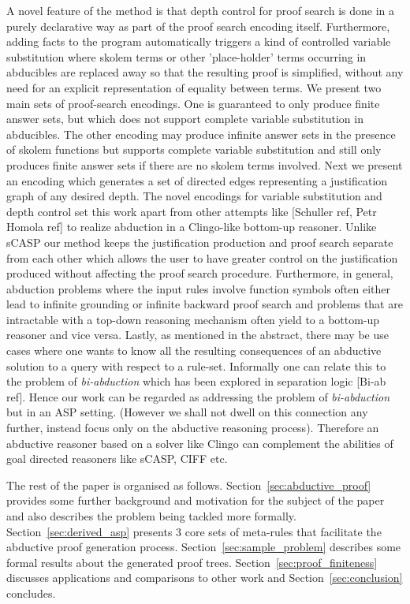 \documentclass[sigconf]{acmart}
\begin{document}
A novel feature of the method is that depth control for proof search is done in a purely declarative way as part of the proof search encoding itself. Furthermore, adding facts to the program automatically triggers a kind of controlled variable substitution where skolem terms or other 'place-holder' terms occurring in abducibles are replaced away so that the resulting proof is simplified, without any need for an explicit representation of equality between terms. We present two main sets of proof-search encodings. One is guaranteed to only produce finite answer sets, but which does not support complete variable substitution in abducibles. The other encoding may produce infinite answer sets in the presence of skolem functions but supports complete variable substitution and still only produces finite answer sets if there are no skolem terms involved. Next we present an encoding which generates a set of directed edges representing a justification graph of any desired depth. The novel encodings for variable substitution and depth control set this work apart from other attempts like [Schuller ref, Petr Homola ref] to realize abduction in a Clingo-like bottom-up reasoner. Unlike sCASP our method keeps the justification production and proof search separate from each other which allows the user to have greater control on the justification produced without affecting the proof search procedure. Furthermore, in general, abduction problems where the input rules involve function symbols often either lead to infinite grounding or infinite backward proof search and problems that are intractable with a top-down reasoning mechanism often yield to a bottom-up reasoner and vice versa. Lastly, as mentioned in the abstract, there may be use cases where one wants to know all the resulting consequences of an abductive solution to a query with respect to a rule-set. Informally one can relate this to the problem of \emph{bi-abduction} which has been explored in separation logic [Bi-ab ref]. Hence our work can be regarded as addressing the problem of \emph{bi-abduction} but in an ASP setting. (However we shall not dwell on this connection any further, instead focus only on the abductive reasoning process). Therefore an abductive reasoner based on a solver like Clingo can complement the abilities of goal directed reasoners like sCASP, CIFF etc.  

The rest of the paper is organised as follows. Section~\ref{sec:abductive_proof} provides some further background and motivation for the subject of the paper and also describes the problem being tackled more formally. Section~\ref{sec:derived_asp} presents 3 core sets of meta-rules that facilitate the abductive proof generation process. Section~\ref{sec:sample_problem} describes some formal results about the generated proof trees. Section~\ref{sec:proof_finiteness} discusses applications and comparisons to other work and Section~\ref{sec:conclusion} concludes.
\end{document}

